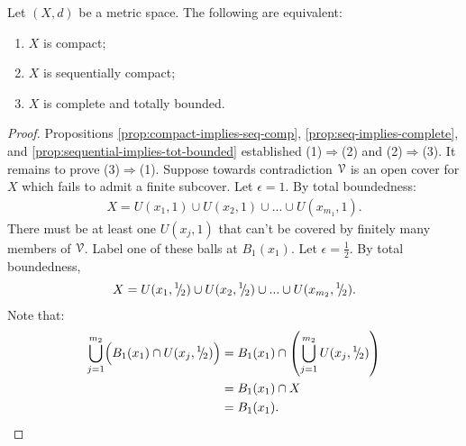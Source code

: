     \begin{theorem}\label{thm:gen-heine-borel}
        Let $(X,d)$ be a metric space. The following are equivalent:
            \begin{enumerate}[label = (\arabic*),itemsep=1pt,topsep=3pt]
                \item $X$ is compact;
                \item $X$ is sequentially compact;
                \item $X$ is complete and totally bounded.
            \end{enumerate}
    \end{theorem}
        \begin{proof}
            Propositions \ref{prop:compact-implies-seq-comp}, \ref{prop:seq-implies-complete}, and \ref{prop:sequential-implies-tot-bounded} established (1)$\Rightarrow$(2) and (2)$\Rightarrow$(3). It remains to prove (3)$\Rightarrow$(1).
            Suppose towards contradiction $\mathcal{V}$ is an open cover for $X$ which fails to admit a finite subcover. Let $\epsilon = 1$. By total boundedness:
                \begin{equation*}
                \begin{split}
                    X = U(x_1,1) \cup U(x_2,1) \cup ... \cup U(x_{m_1},1).
                \end{split}
                \end{equation*}
            There must be at least one $U(x_j,1)$ that can't be covered by finitely many members of $\mathcal{V}$. Label one of these balls at $B_{1}(x_1)$. Let $\epsilon = \frac{1}{2}$. By total boundedness,
                \begin{equation*}
                \begin{split}
                    X = U(x_1,{}^{1}\mskip -5mu/\mskip -3mu_{2}) \cup U(x_2,{}^{1}\mskip -5mu/\mskip -3mu_{2}) \cup ... \cup U(x_{m_2},{}^{1}\mskip -5mu/\mskip -3mu_{2}).
                \end{split}
                \end{equation*}
            Note that:
                \begin{equation*}
                \begin{split}
                    \bigcup_{j = 1}^{m_2}\Bigl( B_{1}(x_1) \cap U(x_j,\sfrac{1}{2}) \Bigr) 
                    & = B_{1}(x_1) \cap \left( \bigcup_{j = 1}^{m_2} U(x_j,\sfrac{1}{2})\right) \\
                    & = B_{1}(x_1) \cap X \\
                    & = B_{1}(x_1).
                \end{split}

\end{equation*}
\end{proof}
